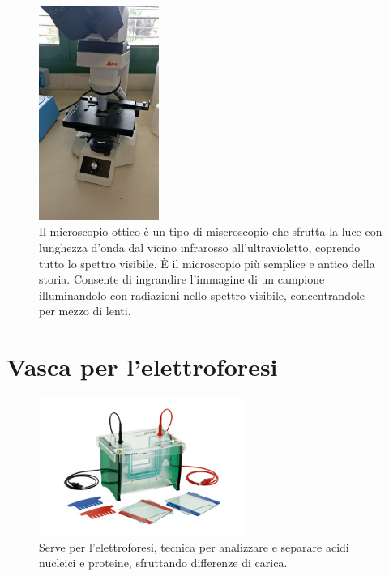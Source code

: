 \documentclass{report}
\begin{document}
	\begin{figure}[H]

		\includegraphics[width=0.35\textwidth]{./immagini/microscopio.jpg}
		\caption{Il microscopio ottico è un tipo di miscroscopio che sfrutta la luce con lunghezza d'onda dal
		vicino infrarosso all'ultravioletto, coprendo tutto lo spettro visibile.
		\`E il microscopio più semplice e antico della storia. Consente di ingrandire l'immagine di un campione
		illuminandolo con radiazioni nello spettro visibile, concentrandole per mezzo di lenti.}
		\label{microscopio}

	\end{figure}

	\vspace{0.5cm}


	\section{Vasca per l'elettroforesi}

	\begin{figure}[H]

		\includegraphics[width=0.6\textwidth]{./immagini/vasca_elettroforesi.jpg}
		\caption{Serve per l'elettroforesi, tecnica per analizzare e separare acidi nucleici e proteine,
		sfruttando differenze di carica.}
		\label{vasca_elettroforesi}

	\end{figure}
\end{document}

